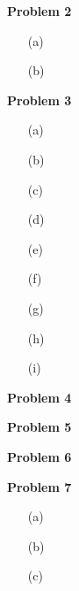 \documentclass[11pt]{article}
\begin{document}
    \begin{center}
        \Large
        \textbf{Problem 2}
    \end{center}
    \normalsize
    \begin{enumerate}
        \item[(a)] %
        \item[(b)] %
    \end{enumerate}

    \begin{center}
        \Large
        \textbf{Problem 3}
    \end{center}
    \normalsize
    \begin{enumerate}
        \item[(a)] %
        \item[(b)] %
        \item[(c)] %
        \item[(d)] %
        \item[(e)] %
        \item[(f)] %
        \item[(g)] %
        \item[(h)] %
        \item[(i)] %
    \end{enumerate}

    \begin{center}
        \Large
        \textbf{Problem 4}
    \end{center}
    \normalsize

    \begin{center}
        \Large
        \textbf{Problem 5}
    \end{center}
    \normalsize

    \begin{center}
        \Large
        \textbf{Problem 6}
    \end{center}
    \normalsize

    \begin{center}
        \Large
        \textbf{Problem 7}
    \end{center}
    \normalsize
    \begin{enumerate}
        \item[(a)] %
        \item[(b)] %
        \item[(c)] %
    \end{enumerate}
\end{document}

